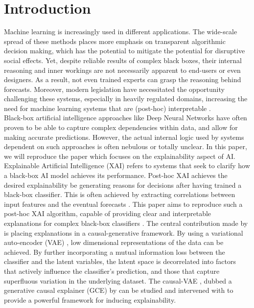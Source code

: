 \section{Introduction}
Machine learning is increasingly used in different applications. The wide-scale spread of these methods places more emphasis on transparent algorithmic decision making, which has the potential  to mitigate the potential for disruptive social effects. Yet, despite reliable results of complex black boxes, their internal reasoning and inner workings are not necessarily apparent to end-users or even designers. As a result, not even trained experts can grasp the reasoning behind forecasts. Moreover, modern legislation have necessitated the opportunity challenging these systems, especially in heavily regulated domains, increasing the need for machine learning systems that are (post-hoc) interpretable \cite{carvalho2019machine}.\\

Black-box artificial intelligence approaches like Deep Neural Networks have often proven to be able to capture complex dependencies within data, and allow for making accurate predictions. However, the actual internal logic used by systems dependent on such approaches is often nebulous or totally unclear.  In this paper, we will reproduce the paper which focuses on the explainability aspect of AI.\\

Explainable Artificial Intelligence (XAI) refers to systems that seek to clarify how a black-box AI model achieves its performance. Post-hoc XAI achieves the desired explainability be generating reasons for decisions after having trained a black-box classifier. This is often achieved by extracting correlations between input features and the eventual forecasts \cite{moradi2021post}. This paper aims to reproduce such a post-hoc XAI algorithm, capable of providing clear and interpretable explanations for complex black-box classifiers \cite{oshaughnessy2020generative}. The central contribution made by \cite{oshaughnessy2020generative} is placing explanations in a causal-generative framework. By using a variational auto-encoder (VAE) \cite{kingma2014autoencoding} , low dimensional representations of the data can be achieved. By further incorporating a mutual information loss between the classifier and the latent variables, the latent space is decorrelated into factors that actively influence the classifier's prediction, and those that capture superfluous variation in the underlying dataset. The causal-VAE , dubbed a generative causal explainer (GCE) by \cite{oshaughnessy2020generative} can be studied and intervened with to provide a powerful framework for inducing explainability.\\

